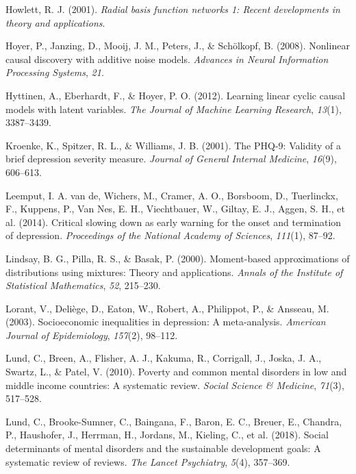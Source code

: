 \documentclass[
]{article}
\newlength{\cslhangindent}
\newenvironment{CSLReferences}[2] %
 {\begin{list}{}{%
  \setlength{\itemindent}{0pt}
  \setlength{\leftmargin}{0pt}
  \setlength{\parsep}{0pt}
  \ifodd #1
   \setlength{\leftmargin}{\cslhangindent}
   \setlength{\itemindent}{-1\cslhangindent}
  \fi
  \setlength{\itemsep}{#2\baselineskip}}}
 {\end{list}}
\begin{document}
\begin{CSLReferences}{1}{0}
Howlett, R. J. (2001). \emph{Radial basis function networks 1: Recent
developments in theory and applications}.

Hoyer, P., Janzing, D., Mooij, J. M., Peters, J., \& Schölkopf, B.
(2008). Nonlinear causal discovery with additive noise models.
\emph{Advances in Neural Information Processing Systems}, \emph{21}.

Hyttinen, A., Eberhardt, F., \& Hoyer, P. O. (2012). Learning linear
cyclic causal models with latent variables. \emph{The Journal of Machine
Learning Research}, \emph{13}(1), 3387--3439.

Kroenke, K., Spitzer, R. L., \& Williams, J. B. (2001). The PHQ-9:
Validity of a brief depression severity measure. \emph{Journal of
General Internal Medicine}, \emph{16}(9), 606--613.

Leemput, I. A. van de, Wichers, M., Cramer, A. O., Borsboom, D.,
Tuerlinckx, F., Kuppens, P., Van Nes, E. H., Viechtbauer, W., Giltay, E.
J., Aggen, S. H., et al. (2014). Critical slowing down as early warning
for the onset and termination of depression. \emph{Proceedings of the
National Academy of Sciences}, \emph{111}(1), 87--92.

Lindsay, B. G., Pilla, R. S., \& Basak, P. (2000). Moment-based
approximations of distributions using mixtures: Theory and applications.
\emph{Annals of the Institute of Statistical Mathematics}, \emph{52},
215--230.

Lorant, V., Deliège, D., Eaton, W., Robert, A., Philippot, P., \&
Ansseau, M. (2003). Socioeconomic inequalities in depression: A
meta-analysis. \emph{American Journal of Epidemiology}, \emph{157}(2),
98--112.

Lund, C., Breen, A., Flisher, A. J., Kakuma, R., Corrigall, J., Joska,
J. A., Swartz, L., \& Patel, V. (2010). Poverty and common mental
disorders in low and middle income countries: A systematic review.
\emph{Social Science \& Medicine}, \emph{71}(3), 517--528.

Lund, C., Brooke-Sumner, C., Baingana, F., Baron, E. C., Breuer, E.,
Chandra, P., Haushofer, J., Herrman, H., Jordans, M., Kieling, C., et
al. (2018). Social determinants of mental disorders and the sustainable
development goals: A systematic review of reviews. \emph{The Lancet
Psychiatry}, \emph{5}(4), 357--369.


\end{CSLReferences}
\end{document}
